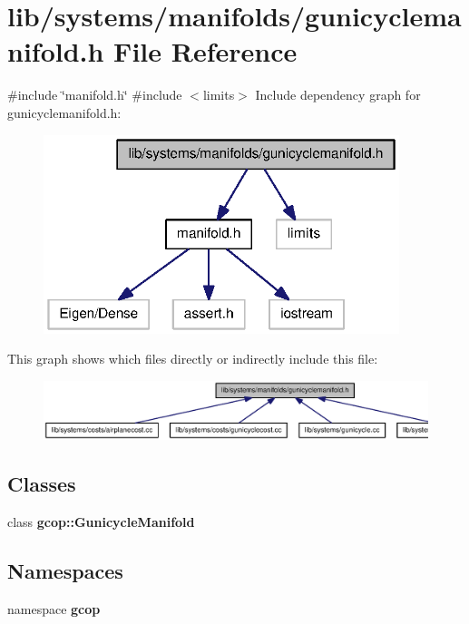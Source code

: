\section{lib/systems/manifolds/gunicyclemanifold.h \-File \-Reference}
\label{gunicyclemanifold_8h}
{\ttfamily \#include \char`\"{}manifold.\-h\char`\"{}}\*
{\ttfamily \#include $<$limits$>$}\*
\-Include dependency graph for gunicyclemanifold.\-h\-:
\nopagebreak
\begin{figure}[H]
\begin{center}
\leavevmode
\includegraphics[width=294pt]{gunicyclemanifold_8h__incl}
\end{center}
\end{figure}
\-This graph shows which files directly or indirectly include this file\-:
\nopagebreak
\begin{figure}[H]
\begin{center}
\leavevmode
\includegraphics[width=350pt]{gunicyclemanifold_8h__dep__incl}
\end{center}
\end{figure}
\subsection*{\-Classes}
\begin{DoxyCompactItemize}
\item 
class {\bf gcop\-::\-Gunicycle\-Manifold}
\end{DoxyCompactItemize}
\subsection*{\-Namespaces}
\begin{DoxyCompactItemize}
\item 
namespace {\bf gcop}
\end{DoxyCompactItemize}
